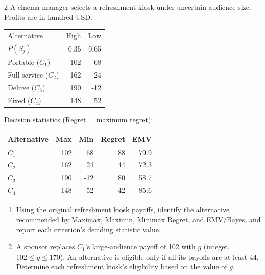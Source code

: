 \begin{multicols}{2}
\raggedcolumns
{}
A cinema manager selects a refreshment kiosk under uncertain audience size. Profits are in hundred USD.

\begin{center}\small\setlength{\tabcolsep}{4pt}
	\begin{tabular}{lrr}\toprule
		Alternative & High & Low\\
		$P(S_j)$ & 0.35 & 0.65\\ \midrule
				Portable ($C_1$) & 102 & 68\\
		Full-service ($C_2$) & 162 & 24\\
		Deluxe ($C_3$) & 190 & -12\\
		Fixed ($C_4$) & 148 & 52\\
		\bottomrule
	\end{tabular}
\end{center} \vspace{-3mm}

Decision statistics (Regret = maximum regret):

\begin{center}\small\setlength{\tabcolsep}{4pt}
	\begin{tabular}{lrrrr}\toprule
		Alternative & Max & Min & Regret & EMV\\ \midrule
				$C_1$ & 102 & 68 & 88 & 79.9\\
		$C_2$ & 162 & 24 & 44 & 72.3\\
		$C_3$ & 190 & -12 & 80 & 58.7\\
		$C_4$ & 148 & 52 & 42 & 85.6\\
		\bottomrule
	\end{tabular}
\end{center}

\begin{enumerate}[label=\textbf{(\alph*)},leftmargin=*]
	\item Using the original refreshment kiosk payoffs, identify the alternative recommended by Maximax, Maximin, Minimax Regret, and EMV/Bayes, and report each criterion's deciding statistic value. 

	\item A sponsor replaces $C_1$'s large-audience payoff of 102 with $g$ (integer, $102\leq g\leq170$). An alternative is eligible only if all its payoffs are at least 44. Determine each refreshment kiosk's eligibility based on the value of $g$. 


\end{enumerate}
\end{multicols}
